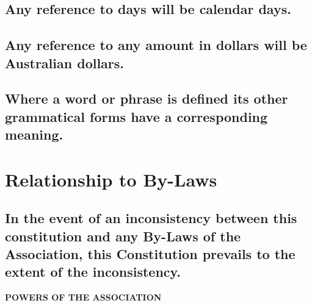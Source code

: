 \documentclass{article}
\newenvironment{subs}
  {\adjustwidth{2em}{0pt}}
  {\endadjustwidth}
\begin{document}
\begin{subs}
\subsection{Any reference to days will be calendar days.}
\subsection{Any reference to any amount in dollars will be Australian dollars.}
\subsection{Where a word or phrase is defined its other grammatical forms have a corresponding meaning.}
\end{subs}

\section{Relationship to By-Laws}
\begin{subs}
\subsection{In the event of an inconsistency between this constitution and any By-Laws of the Association, this Constitution prevails to the extent of the inconsistency.}
\end{subs}
\newpage

{\large\bf POWERS OF THE ASSOCIATION\par}
\hrulefill
\end{document}
